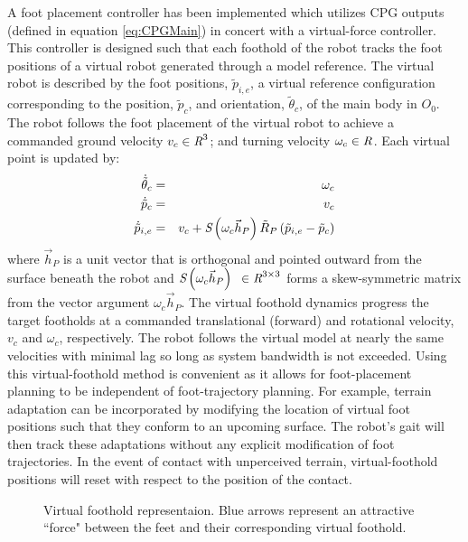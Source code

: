		A foot placement controller has been implemented which utilizes CPG outputs (defined in equation \ref{eq:CPGMain}) in concert with a virtual-force controller. This controller is designed such that each foothold of the robot tracks the foot positions of a virtual robot generated through a model reference. The virtual robot is described by the foot positions, $\tilde{p}_{i,e}$, a virtual reference configuration corresponding to the position, $\tilde{p}_{c}$, and orientation, $\tilde{\theta}_{c}$, of the main body in $O_{0}$. The robot follows the foot placement of the virtual robot to achieve a commanded ground velocity $v_{c} \in\emph{R}^{3} $; and turning velocity $\omega_{c} \in\emph{R}^{}$. Each virtual point is updated by:
		\begin{eqnarray}
			\dot{\tilde{\theta}}_{c}	& = & \omega_{c} 	\nonumber\\
			\dot{\tilde{p}}_{c}			& = & v_{c}			\nonumber\\
			\dot{\tilde{p}}_{i,e} 		& = & v_{c} + \emph{S}\left(\omega_{c}\vec{h}_P\right) \tilde{R}_{P} \left(\tilde{p}_{i,e}-\tilde{p}_{c} \right) 
			\label{eq::virtual_foothold_control}
		\end{eqnarray}
		where $\vec{h}_P$ is a unit vector that is orthogonal and pointed outward from the surface beneath the robot and 
		$\emph{S}\left(\omega_{c}\vec{h}_P\right)\text{ }\in \emph{R}^{3\times3}$ forms a skew-symmetric matrix from the vector argument $\omega_{c}\vec{h}_P$. The virtual foothold dynamics progress the target footholds at a commanded translational (forward) and rotational velocity, $v_{c}$ and $\omega_{c}$, respectively. The robot follows the virtual model at nearly the same velocities with minimal lag so long as system bandwidth is not exceeded. Using this virtual-foothold method is convenient as it allows for foot-placement planning to be independent of foot-trajectory planning. For example, terrain adaptation can be incorporated by modifying the location of virtual foot positions such that they conform to an upcoming surface. The robot's gait will then track these adaptations without any explicit modification of foot trajectories. In the event of contact with unperceived terrain, virtual-foothold positions will reset with respect to the position of the contact.
%
			\begin{figure}[h!]
				\centering
				\caption{ Virtual foothold representaion. Blue arrows represent an attractive ``force" between the feet and their corresponding virtual foothold.}
				\label{fig::virtial_foothold}
			\end{figure}
